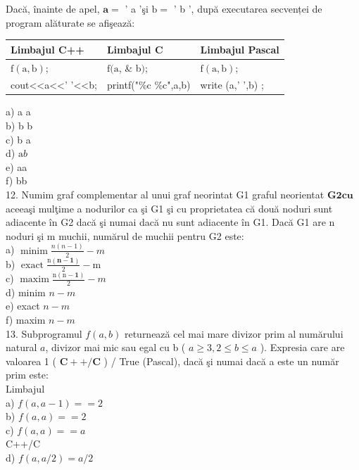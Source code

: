 \documentclass[10pt]{article}
\begin{document}
Dacă, înainte de apel, $\mathbf{a =}$ ' a 'şi $\mathrm{b}=$ ' b ', după executarea secvenței de program alăturate se afişează:

\begin{center}
\begin{tabular}{|l|l|l|}
\hline
Limbajul C++ & Limbajul C & Limbajul Pascal \\
\hline
$\mathrm{f}(\mathrm{a}, \mathrm{b})$; & $\mathrm{f}(\mathrm{a}$, \& b$)$; & $\mathrm{f}(\mathrm{a}, \mathrm{b})$; \\
\hline
cout<<a<<' '<<b; & printf("\%c \%c",a,b) & write (a,' ',b) ; \\
\hline
\end{tabular}
\end{center}

a) a a\\
b) b b\\
c) b a\\
d) $\mathrm{a} b$\\
e) aa\\
f) bb\\
12. Numim graf complementar al unui graf neorintat G1 graful neorientat $\mathbf{G 2} \mathbf{c u}$ aceeaşi mulţime a nodurilor ca şi G1 şi cu proprietatea că două noduri sunt adiacente în G2 dacă şi numai dacă nu sunt adiacente în G1. Dacă G1 are n noduri şi m muchii, numărul de muchii pentru G2 este:\\
a) $\operatorname{minim} \frac{n(n-1)}{2}-m$\\
b) $\operatorname{exact} \frac{\mathrm{n}(\mathbf{n}-\mathbf{1})}{2}-\mathrm{m}$\\
c) $\operatorname{maxim} \frac{\mathrm{n}(\mathrm{n}-\mathbf{1})}{2}-m$\\
d) minim $n-m$\\
e) exact $n-m$\\
f) maxim $n-m$\\
13. Subprogramul $f(a, b)$ returnează cel mai mare divizor prim al numărului natural $a$, divizor mai mic sau egal cu b ( $a \geq 3,2 \leq b \leq a$ ). Expresia care are valoarea 1 ( $\mathbf{C}++/ \mathbf{C}$ ) / True (Pascal), dacă şi numai dacă a este un număr prim este:\\
Limbajul\\
a) $f(a, a-1)==2$\\
b) $f(a, a)==2$\\
c) $f(a, a)==a$\\
C++/C\\
d) $f(a, a / 2)=a / 2$\\
\end{document}
